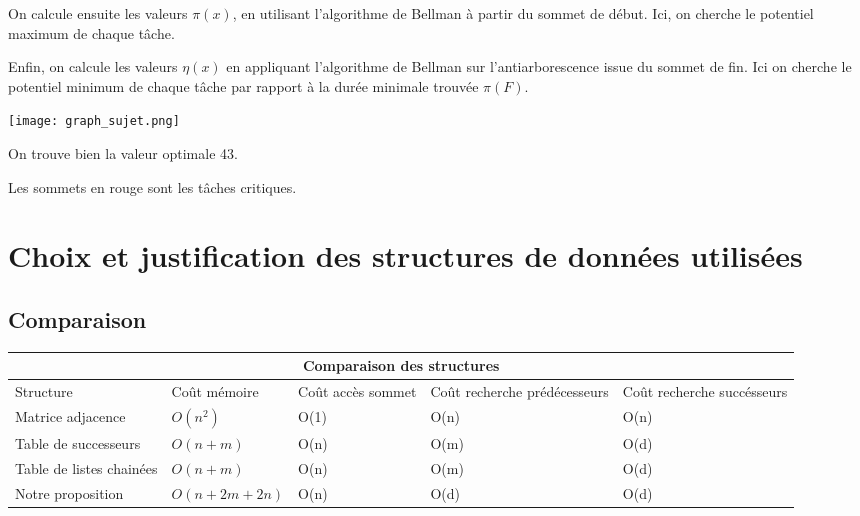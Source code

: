 \documentclass{article}
\begin{document}
On calcule ensuite les valeurs $\pi(x)$, en utilisant l'algorithme de Bellman à partir du sommet de début. Ici, on cherche le potentiel maximum de chaque tâche.

Enfin, on calcule les valeurs $\eta(x)$ en appliquant l'algorithme de Bellman sur l'antiarborescence issue du sommet de fin. Ici on cherche le potentiel minimum de chaque tâche par rapport à la durée minimale trouvée $\pi(F)$.

\begin{center} 
\texttt{[image: graph\_sujet.png]}
\end{center} 

On trouve bien la valeur optimale 43.

Les sommets en rouge sont les tâches critiques.

\section{Choix et justification des structures de données utilisées}

\subsection{Comparaison}

\begin{tabular}{ |p{2cm}|p{2cm}|p{2cm}|p{2cm}|p{2cm}|  }
 \hline
 \multicolumn{5}{|c|}{Comparaison des structures} \\
 \hline
 Structure& Coût mémoire& Coût accès sommet& Coût recherche prédécesseurs& Coût recherche succésseurs\\
 \hline
 Matrice adjacence& $O(n^2)$& O(1)& O(n)& O(n)\\\hline
 Table de successeurs& $O(n+m)$& O(n)& O(m)& O(d)\\\hline
 Table de listes chainées& $O(n+m)$& O(n)& O(m)& O(d)\\\hline
 Notre proposition& $O(n+2m+2n)$& O(n)& O(d)& O(d)\\\hline

 \hline
\end{tabular}

\paragraph{}
\end{document}
